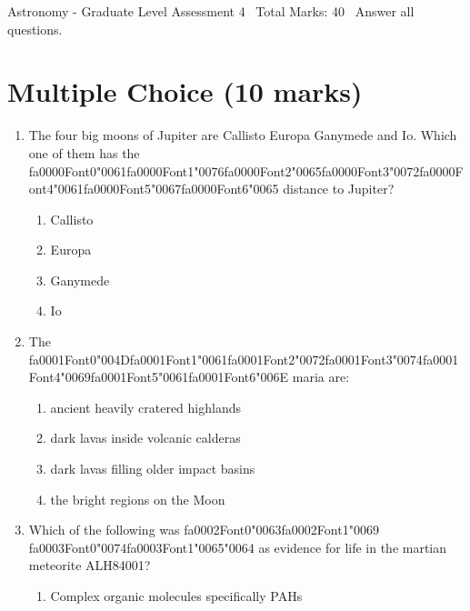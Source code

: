 \documentclass[12pt]{article}
\begin{document}
\begin{center}
Astronomy - Graduate Level Assessment 4 \
Total Marks: 40 \
Answer all questions.
\end{center}

\section*{Multiple Choice (10 marks)}
\begin{enumerate}[label=\arabic*.]
\item The four big moons of Jupiter are Callisto Europa Ganymede and Io. Which one of them has
the {\csname fa0000Font0\endcsname\char"0061}{\csname fa0000Font1\endcsname\char"0076}{\csname fa0000Font2\endcsname\char"0065}{\csname fa0000Font3\endcsname\char"0072}{\csname fa0000Font4\endcsname\char"0061}{\csname fa0000Font5\endcsname\char"0067}{\csname fa0000Font6\endcsname\char"0065} distance to Jupiter?
\begin{enumerate}[label=(\alph*)]
    \item Callisto
    \item Europa
    \item Ganymede
    \item Io
\end{enumerate}
\item The {\csname fa0001Font0\endcsname\char"004D}{\csname fa0001Font1\endcsname\char"0061}{\csname fa0001Font2\endcsname\char"0072}{\csname fa0001Font3\endcsname\char"0074}{\csname fa0001Font4\endcsname\char"0069}{\csname fa0001Font5\endcsname\char"0061}{\csname fa0001Font6\endcsname\char"006E} maria are:
\begin{enumerate}[label=(\alph*)]
    \item ancient heavily cratered highlands
    \item dark lavas inside volcanic calderas
    \item dark lavas filling older impact basins
    \item the bright regions on the Moon
\end{enumerate}
\item Which of the following was {\csname fa0002Font0\endcsname\char"0063}{\csname fa0002Font1\endcsname\char"0069} {\csname fa0003Font0\endcsname\char"0074}{\csname fa0003Font1\endcsname\char"0065}{\char"0064} as evidence for life in the martian meteorite
ALH84001?
\begin{enumerate}[label=(\alph*)]
    \item Complex organic molecules specifically PAHs

\end{enumerate}
\end{enumerate}
\end{document}
